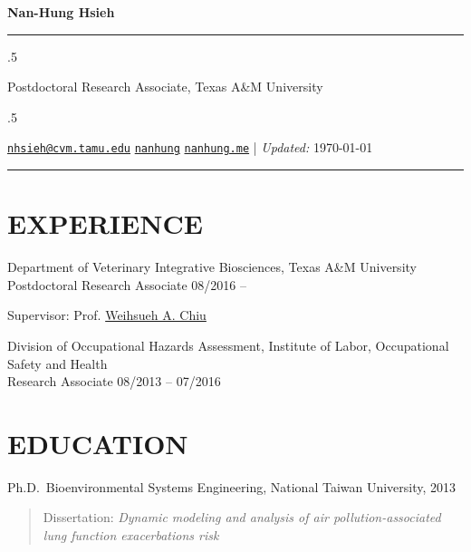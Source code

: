 \documentclass[10pt,]{article}
\begin{document}
\centerline{\huge \bf Nan-Hung Hsieh}

\vspace{2 mm}

\hrule

\vspace{2 mm}

\moveleft.5\hoffset\centerline{Postdoctoral Research Associate, Texas A\&M University}

\moveleft.5\hoffset\centerline{ \faEnvelopeO \hspace{1 mm} \href{mailto:}{\tt \href{mailto:nhsieh@cvm.tamu.edu}{\nolinkurl{nhsieh@cvm.tamu.edu}}} \hspace{1 mm}  \faGithub \hspace{1 mm} \href{http://github.com/nanhung}{\tt nanhung} \hspace{1 mm}    \faGlobe \hspace{1 mm} \href{http://nanhung.me}{\tt nanhung.me}    | \emph{Updated:} \today}

\vspace{2 mm}

\hrule


\section{EXPERIENCE}\label{experience}

Department of Veterinary Integrative Biosciences, Texas A\&M
University\\
Postdoctoral Research Associate \hfill 08/2016 --

\hfill Supervisor: Prof.
\href{http://vetmed.tamu.edu/vibs/directorydetail?userid=13388}{Weihsueh
A. Chiu}

Division of Occupational Hazards Assessment, Institute of Labor,
Occupational Safety and Health\\
Research Associate \hfill 08/2013 -- 07/2016

\section{EDUCATION}\label{education}

Ph.D.~Bioenvironmental Systems Engineering, National Taiwan University,
2013

\begin{quote}
Dissertation: \emph{Dynamic modeling and analysis of air
pollution-associated lung function exacerbations risk}
\end{quote}
\end{document}

